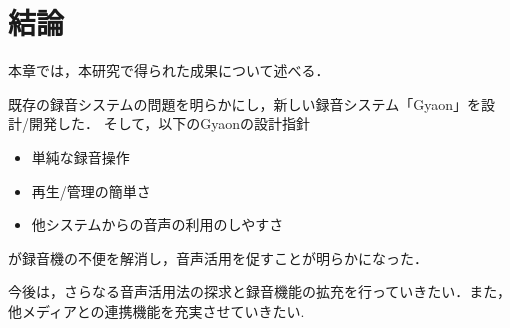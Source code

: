 \chapter{結論}
\label{chap:conclusion}

本章では，本研究で得られた成果について述べる．

\newpage

既存の録音システムの問題を明らかにし，新しい録音システム「Gyaon」を設計/開発した．
そして，以下のGyaonの設計指針

\begin{itemize}
\item 単純な録音操作
\item 再生/管理の簡単さ
\item 他システムからの音声の利用のしやすさ
\end{itemize}

が録音機の不便を解消し，音声活用を促すことが明らかになった．

今後は，さらなる音声活用法の探求と録音機能の拡充を行っていきたい．また，他メディアとの連携機能を充実させていきたい.
